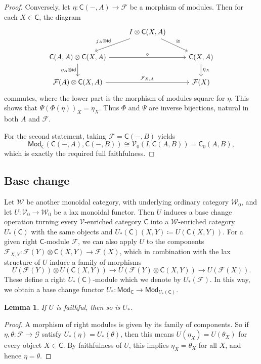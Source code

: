 \documentclass[11pt,onecolumn]{article}
\newcommand{\id}{\mathsf{id}}
\newcommand{\cV}{\mathscr{V}}
\newcommand{\cW}{\mathscr{W}}
\newcommand{\cC}{\mathsf{C}}
\newcommand{\Mod}{\mathsf{Mod}}
\theoremstyle{plain}
\newtheorem{lem}[lem]{Lemma}
\theoremstyle{remark}
\theoremstyle{definition}
\begin{document}
\begin{proof}
	Conversely, let $\eta \colon \cC(-, A) \to \mathcal{F}$ be a morphism of modules.
	Then for each $X \in \cC$, the diagram
	\[
		\begin{tikzcd}
			& I \otimes \cC(X, A) \ar[dr, "\cong"] \ar[dl, "j_A \otimes \id"'] & \\
			\cC(A, A) \otimes \cC(X, A) \ar[rr, "\circ"] \ar[d, "\eta_A \otimes \id"'] & & \cC(X, A) \ar[d, "\eta_X"] \\
			\mathcal{F}(A) \otimes \cC(X, A) \ar[rr, "\mathcal{F}_{X, A}"] & & \mathcal{F}(X)
		\end{tikzcd}
	\]
	commutes, where the lower part is the morphism of modules square for $\eta$.
	This shows that $\Psi(\Phi(\eta))_X = \eta_X$.
	Thus $\Phi$ and $\Psi$ are inverse bijections, natural in both $A$ and $\mathcal{F}$.

	For the second statement,
	taking $\mathcal{F} = \cC(-, B)$ yields
	\[
		\Mod_\cC(\cC(-, A), \cC(-, B)) \cong \cV_0(I, \cC(A, B)) = \cC_0(A, B),
	\]
	which is exactly the required full faithfulness.
\end{proof}

\subsection{Base change}
\label{sec:base_change}

Let $\cW$ be another monoidal category, with underlying ordinary category $\cW_0$, and let $U : \cV_0 \to \cW_0$ be a lax monoidal functor.
Then $U$ induces a base change operation turning every $\cV$-enriched category $\cC$ into a $\cW$-enriched category $U_*(\cC)$ with the same objects and $U_*(\cC)(X, Y) \coloneqq U(\cC(X, Y))$.
For a given right $\cC$-module $\mathcal{F}$, we can also apply $U$ to the components $\mathcal{F}_{X,Y} : \mathcal{F}(Y) \otimes \cC(X, Y) \longrightarrow \mathcal{F}(X)$,
which in combination with the lax structure of $U$ induce a family of morphisms
\[
	U(\mathcal{F}(Y)) \otimes U(\cC(X, Y)) \longrightarrow U(\mathcal{F}(Y) \otimes \cC(X, Y)) \longrightarrow U(\mathcal{F}(X)).
\]
These define a right $U_*(\cC)$-module which we denote by $U_*(\mathcal{F})$.
In this way, we obtain a base change functor $U_* : \Mod_\cC \longrightarrow \Mod_{U_*(\cC)}$.

\begin{lem}
	\label{faithful}
	If $U$ is faithful, then so is $U_*$.
\end{lem}

\begin{proof}
	A morphism of right modules is given by its family of components.
	So if $\eta, \theta \colon \mathcal{F} \to \mathcal{G}$ satisfy $U_*(\eta) = U_*(\theta)$, then this means $U(\eta_X) = U(\theta_X)$
	for every object $X \in \cC$.
	By faithfulness of $U$, this implies $\eta_X = \theta_X$ for all $X$, and hence $\eta = \theta$.
\end{proof}
\end{document}
